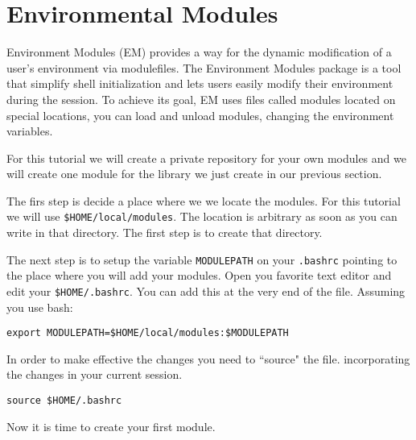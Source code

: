 \section{Environmental Modules}

Environment Modules (EM) provides a way for the dynamic modification of a user's environment via modulefiles.
The Environment Modules package is a tool that simplify shell initialization and lets users easily modify their environment during the session.
To achieve its goal, EM uses files called modules located on special locations, you can load and unload modules, changing the environment variables.

For this tutorial we will create a private repository for your own modules and we will create one module for the library we just create in our previous section.

The firs step is decide a place where we we locate the modules. For this tutorial we will use \verb|$HOME/local/modules|. The location is arbitrary as soon as you can write in that directory. The first step is to create that directory.

The next step is to setup the variable \texttt{MODULEPATH} on your \texttt{.bashrc} pointing to the place where you will add your modules. Open you favorite text editor and edit your \verb|$HOME/.bashrc|. You can add this at the very end of the file. Assuming you use bash:

\begin{lstlisting}
export MODULEPATH=$HOME/local/modules:$MODULEPATH
\end{lstlisting}

In order to make effective the changes you need to ``source" the file. incorporating the changes in your current session.

\begin{lstlisting}
source $HOME/.bashrc
\end{lstlisting}

Now it is time to create your first module. 





